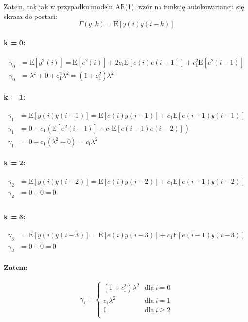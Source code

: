 \documentclass[11pt, a4paper]{article}
\begin{document}
Zatem, tak jak w przypadku modelu AR(1), wzór na funkcję autokowariancji się skraca do postaci:
\[
	\Gamma(y,k) = \text{E}[y(i)y(i-k)]
\]

\paragraph{k = 0:}
\begin{align*}
	\gamma_0 &=
		\text{E}[y^2(i)] = \text{E}[e^2(i)] + 2 c_1 \text{E}[e(i)e(i-1)] + c_1^2 \text{E}[e^2(i-1)] \\
	\gamma_0 &=
		\lambda^2 + 0 + c_1^2 \lambda^2 = (1 + c_1^2) \lambda^2
\end{align*}

\paragraph{k = 1:}
\begin{align*}
	\gamma_1 &=
		\text{E}[y(i)y(i-1)] = \text{E}[e(i)y(i-1)] + c_1 \text{E}[e(i-1)y(i-1)] \\
	\gamma_1 &=
		0 + c_1 \left(
			\text{E}[e^2(i-1)] + c_1 \text{E}[e(i-1)e(i-2)] 
			\right) \\
	\gamma_1 &=
		0 + c_1 \left(
			\lambda^2 + 0
			\right) = c_1 \lambda^2
\end{align*}


\paragraph{k = 2:}
\begin{align*}
	\gamma_2 &=
		\text{E}[y(i)y(i-2)] = \text{E}[e(i)y(i-2)] + c_1 \text{E}[e(i-1)y(i-2)] \\
	\gamma_2 &=
		0 + 0 = 0 \\
\end{align*}

\paragraph{k = 3:}
\begin{align*}
	\gamma_3 &=
		\text{E}[y(i)y(i-3)] = \text{E}[e(i)y(i-3)] + c_1 \text{E}[e(i-1)y(i-3)] \\
	\gamma_3 &=
		0 + 0 = 0
\end{align*}

\paragraph{Zatem:}
\[
	\gamma_i = \begin{cases}
		(1 + c_1^2) \lambda^2 &
			\text{dla} \ i = 0 \\
		c_1 \lambda^2 &
			\text{dla} \ i = 1 \\
		0 &
			\text{dla} \ i \ge 2 \\
	\end{cases}
\]
\end{document}
